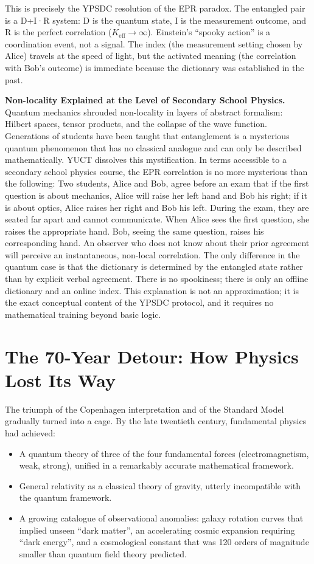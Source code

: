 \documentclass[12pt,a4paper]{article}
\begin{document}
	This is precisely the YPSDC resolution of the EPR paradox. The entangled pair is a D+I·R system: D is the quantum state, I is the measurement outcome, and R is the perfect correlation (\(K_{\mathrm{eff}} \to \infty\)). Einstein's ``spooky action'' is a coordination event, not a signal. The index (the measurement setting chosen by Alice) travels at the speed of light, but the activated meaning (the correlation with Bob's outcome) is immediate because the dictionary was established in the past.
	
	\textbf{Non-locality Explained at the Level of Secondary School Physics.} Quantum mechanics shrouded non-locality in layers of abstract formalism: Hilbert spaces, tensor products, and the collapse of the wave function. Generations of students have been taught that entanglement is a mysterious quantum phenomenon that has no classical analogue and can only be described mathematically. YUCT dissolves this mystification. In terms accessible to a secondary school physics course, the EPR correlation is no more mysterious than the following: Two students, Alice and Bob, agree before an exam that if the first question is about mechanics, Alice will raise her left hand and Bob his right; if it is about optics, Alice raises her right and Bob his left. During the exam, they are seated far apart and cannot communicate. When Alice sees the first question, she raises the appropriate hand. Bob, seeing the same question, raises his corresponding hand. An observer who does not know about their prior agreement will perceive an instantaneous, non-local correlation. The only difference in the quantum case is that the dictionary is determined by the entangled state rather than by explicit verbal agreement. There is no spookiness; there is only an offline dictionary and an online index. This explanation is not an approximation; it is the exact conceptual content of the YPSDC protocol, and it requires no mathematical training beyond basic logic.
	
	\section{The 70-Year Detour: How Physics Lost Its Way}
	
	The triumph of the Copenhagen interpretation and of the Standard Model gradually turned into a cage. By the late twentieth century, fundamental physics had achieved:
	\begin{itemize}
		\item A quantum theory of three of the four fundamental forces (electromagnetism, weak, strong), unified in a remarkably accurate mathematical framework.
		\item General relativity as a classical theory of gravity, utterly incompatible with the quantum framework.
		\item A growing catalogue of observational anomalies: galaxy rotation curves that implied unseen ``dark matter'', an accelerating cosmic expansion requiring ``dark energy'', and a cosmological constant that was 120 orders of magnitude smaller than quantum field theory predicted.
	\end{itemize}
	
\end{document}
